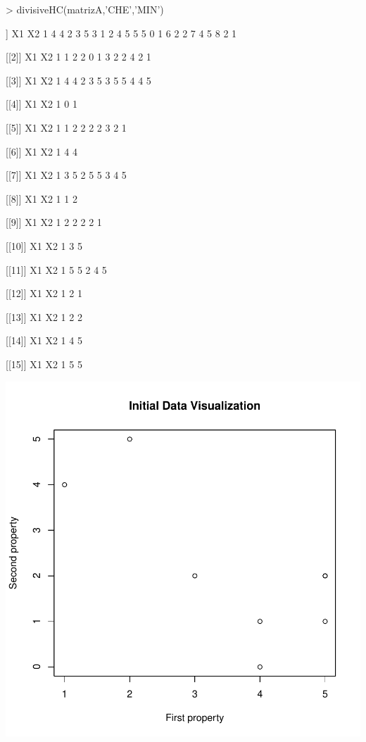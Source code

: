 \documentclass[a4paper]{article}
\begin{document}
\begin{Schunk}
\begin{Sinput}
> divisiveHC(matrizA,'CHE','MIN')
\end{Sinput}
\begin{Soutput}
[[1]]
  X1 X2
1  4  4
2  3  5
3  1  2
4  5  5
5  0  1
6  2  2
7  4  5
8  2  1

[[2]]
  X1 X2
1  1  2
2  0  1
3  2  2
4  2  1

[[3]]
  X1 X2
1  4  4
2  3  5
3  5  5
4  4  5

[[4]]
  X1 X2
1  0  1

[[5]]
  X1 X2
1  1  2
2  2  2
3  2  1

[[6]]
  X1 X2
1  4  4

[[7]]
  X1 X2
1  3  5
2  5  5
3  4  5

[[8]]
  X1 X2
1  1  2

[[9]]
  X1 X2
1  2  2
2  2  1

[[10]]
  X1 X2
1  3  5

[[11]]
  X1 X2
1  5  5
2  4  5

[[12]]
  X1 X2
1  2  1

[[13]]
  X1 X2
1  2  2

[[14]]
  X1 X2
1  4  5

[[15]]
  X1 X2
1  5  5
\end{Soutput}
\end{Schunk}
\includegraphics{practica4-divisivo}
\end{document}
